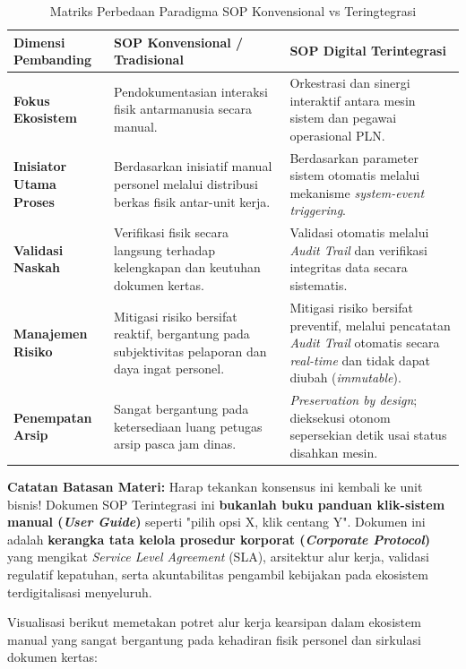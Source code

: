 \documentclass[12pt,a4paper]{report}
\begin{document}
\begin{table}[H]
\centering
\small
\caption{Matriks Perbedaan Paradigma SOP Konvensional vs Teringtegrasi}
\begin{tabularx}{\textwidth}{@{} p{3.5cm} >{\raggedright\arraybackslash}X >{\raggedright\arraybackslash}X @{}}
\toprule
\textbf{Dimensi Pembanding} & \textbf{SOP Konvensional / Tradisional} & \textbf{SOP Digital Terintegrasi} \\
\midrule
\textbf{Fokus Ekosistem} & Pendokumentasian interaksi fisik antarmanusia secara manual. & Orkestrasi dan sinergi interaktif antara mesin sistem dan pegawai operasional PLN. \\
\textbf{Inisiator Utama Proses} & Berdasarkan inisiatif manual personel melalui distribusi berkas fisik antar-unit kerja. & Berdasarkan parameter sistem otomatis melalui mekanisme \textit{system-event triggering}. \\
\textbf{Validasi Naskah} & Verifikasi fisik secara langsung terhadap kelengkapan dan keutuhan dokumen kertas. & Validasi otomatis melalui \textit{Audit Trail} dan verifikasi integritas data secara sistematis. \\
\textbf{Manajemen Risiko} & Mitigasi risiko bersifat reaktif, bergantung pada subjektivitas pelaporan dan daya ingat personel. & Mitigasi risiko bersifat preventif, melalui pencatatan \textit{Audit Trail} otomatis secara \textit{real-time} dan tidak dapat diubah (\textit{immutable}). \\
\textbf{Penempatan Arsip} & Sangat bergantung pada ketersediaan luang petugas arsip pasca jam dinas. & \textit{Preservation by design}; dieksekusi otonom sepersekian detik usai status disahkan mesin. \\
\bottomrule
\end{tabularx}
\end{table}

\begin{warnbox}
\textbf{Catatan Batasan Materi:} Harap tekankan konsensus ini kembali ke unit bisnis! Dokumen SOP Terintegrasi ini \textbf{bukanlah buku panduan klik-sistem manual (\textit{User Guide})} seperti "pilih opsi X, klik centang Y". Dokumen ini adalah \textbf{kerangka tata kelola prosedur korporat (\textit{Corporate Protocol})} yang mengikat \textit{Service Level Agreement} (SLA), arsitektur alur kerja, validasi regulatif kepatuhan, serta akuntabilitas pengambil kebijakan pada ekosistem terdigitalisasi menyeluruh.
\end{warnbox}

Visualisasi berikut memetakan potret alur kerja kearsipan dalam ekosistem manual yang sangat bergantung pada kehadiran fisik personel dan sirkulasi dokumen kertas:
\end{document}
